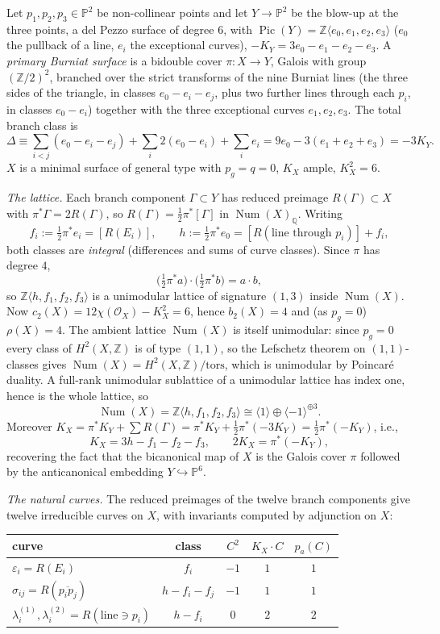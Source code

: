 \documentclass{amsart}
\theoremstyle{definition}
\newcommand{\OO}{\mathcal{O}}
\newcommand{\PP}{\mathbb{P}}
\newcommand{\ZZ}{\mathbb{Z}}
\newcommand{\Num}{\operatorname{Num}}
\newcommand{\Pic}{\operatorname{Pic}}
\begin{document}
Let $p_1,p_2,p_3\in\PP^2$ be non-collinear points and let $Y\to\PP^2$ be the blow-up at the three points, a del Pezzo surface of degree $6$, with $\Pic(Y)=\ZZ\langle e_0,e_1,e_2,e_3\rangle$ ($e_0$ the pullback of a line, $e_i$ the exceptional curves), $-K_Y=3e_0-e_1-e_2-e_3$. A \emph{primary Burniat surface} is a bidouble cover $\pi:X\to Y$, Galois with group $(\ZZ/2)^2$, branched over the strict transforms of the nine Burniat lines (the three sides of the triangle, in classes $e_0-e_i-e_j$, plus two further lines through each $p_i$, in classes $e_0-e_i$) together with the three exceptional curves $e_1,e_2,e_3$. The total branch class is
\[
\Delta\equiv\textstyle\sum_{i<j}(e_0-e_i-e_j)+\sum_i2(e_0-e_i)+\sum_ie_i=9e_0-3(e_1+e_2+e_3)=-3K_Y .
\]
$X$ is a minimal surface of general type with $p_g=q=0$, $K_X$ ample, $K_X^2=6$.

\smallskip
\noindent \emph{The lattice.} Each branch component $\Gamma\subset Y$ has reduced preimage $R(\Gamma)\subset X$ with $\pi^*\Gamma=2R(\Gamma)$, so $R(\Gamma)=\tfrac12\pi^*[\Gamma]$ in $\Num(X)_\mathbb{Q}$. Writing
\[
f_i:=\tfrac12\pi^*e_i=[R(E_i)],\qquad
h:=\tfrac12\pi^*e_0=[R(\text{line through }p_i)]+f_i ,
\]
both classes are \emph{integral} (differences and sums of curve classes). Since $\pi$ has degree $4$,
\[
\bigl(\tfrac12\pi^*a\bigr)\cdot\bigl(\tfrac12\pi^*b\bigr)=a\cdot b ,
\]
so $\ZZ\langle h,f_1,f_2,f_3\rangle$ is a unimodular lattice of signature $(1,3)$ inside $\Num(X)$. Now $c_2(X)=12\chi(\OO_X)-K_X^2=6$, hence $b_2(X)=4$ and (as $p_g=0$) $\rho(X)=4$. The ambient lattice $\Num(X)$ is itself unimodular: since $p_g=0$ every class of $H^2(X,\ZZ)$ is of type $(1,1)$, so the Lefschetz theorem on $(1,1)$-classes gives $\Num(X)=H^2(X,\ZZ)/\mathrm{tors}$, which is unimodular by Poincar\'e duality. A full-rank unimodular sublattice of a unimodular lattice has index one, hence is the whole lattice, so
\[
\Num(X)=\ZZ\langle h,f_1,f_2,f_3\rangle\cong\langle1\rangle\oplus\langle-1\rangle^{\oplus3}.
\]
Moreover $K_X=\pi^*K_Y+\sum R(\Gamma)=\pi^*K_Y+\tfrac12\pi^*(-3K_Y)=\tfrac12\pi^*(-K_Y)$, i.e.,
\[
K_X=3h-f_1-f_2-f_3,\qquad 2K_X=\pi^*(-K_Y),
\]
recovering the fact that the bicanonical map of $X$ is the Galois cover $\pi$ followed by the anticanonical embedding $Y\hookrightarrow\PP^6$.

\smallskip
\noindent \emph{The natural curves.} The reduced preimages of the twelve branch components give twelve irreducible curves on $X$, with invariants computed by adjunction on $X$:
\begin{center}
\begin{tabular}{lcccc}
\toprule
curve & class & $C^2$ & $K_X\cdot C$ & $p_a(C)$\\
\midrule
$\varepsilon_i=R(E_i)$ & $f_i$ & $-1$ & $1$ & $1$\\
$\sigma_{ij}=R(\overline{p_ip_j})$ & $h-f_i-f_j$ & $-1$ & $1$ & $1$\\
$\lambda_i^{(1)},\lambda_i^{(2)}=R(\text{line}\ni p_i)$ & $h-f_i$ & $0$ & $2$ & $2$\\
\bottomrule
\end{tabular}
\end{center}
\end{document}
